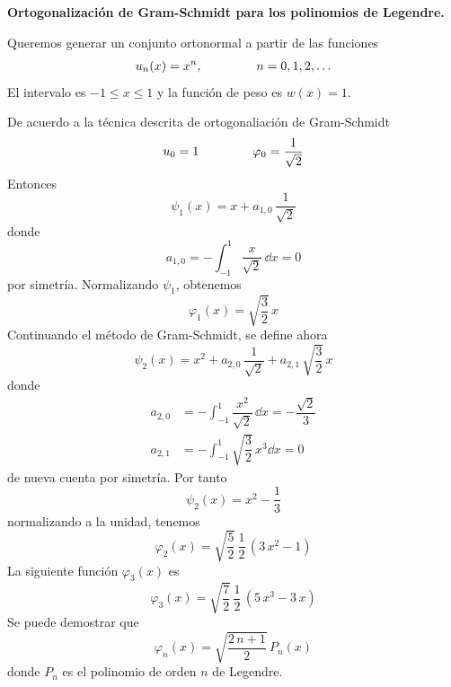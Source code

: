\begin{ejemplo} \textbf{Ortogonalización de Gram-Schmidt para los polinomios de Legendre.}

Queremos generar un conjunto ortonormal a partir de las funciones 
\begin{align*}
u_{n}(x) = x^{n}, \hspace{1.5cm} n = 0, 1, 2, \ldots
\end{align*}
El intervalo es $-1 \leq x \leq 1$ y la función de peso es $w(x)=1$.
\par
De acuerdo a la técnica descrita de ortogonaliación de Gram-Schmidt
\begin{equation}
u_{0} = 1 \hspace{1.5cm} \varphi_{0} =  \dfrac{1}{\sqrt{2}}
\label{eq:ecuacion_10_50}
\end{equation}
Entonces
\begin{equation}
\psi_{1}(x) = x + a_{1,0} \, \dfrac{1}{\sqrt{2}}
\label{eq:ecuacion_10_51}
\end{equation}
donde
\begin{equation}
a_{1, 0} = - \int_{-1}^{1} \dfrac{x}{\sqrt{2}} \, \dd{x} = 0
\label{eq:ecuacion_10_52}
\end{equation}
por simetría. Normalizando $\psi_{1}$, obtenemos
\begin{equation}
\varphi_{1}(x) = \sqrt{\dfrac{3}{2}} \, x
\label{eq:ecuacion_10_53}
\end{equation}
Continuando el método de Gram-Schmidt, se define ahora
\begin{equation}
\psi_{2} (x) = x^{2} +  a_{2, 0} \, \dfrac{1}{\sqrt{2}} +  a_{2, 1} \, \sqrt{\dfrac{3}{2}} \, x
\label{eq:ecuacion_10_54}
\end{equation}
donde
\begin{align}
a_{2, 0} &= - \int_{-1}^{1} \dfrac{x^{2}}{\sqrt{2}} \, \dd{x} = - \dfrac{\sqrt{2}}{3} \label{eq:ecuacion_10_55} \\[1em] 
a_{2, 1} &= - \int_{-1}^{1} \sqrt{\dfrac{3}{2}} \, x^{3} \dd{x} = 0 \label{eq:ecuacion_10_56}
\end{align}
de nueva cuenta por simetría. Por tanto
\begin{equation}
\psi_{2}(x) = x^{2} - \dfrac{1}{3}
\label{eq:ecuacion_10_57}
\end{equation}
normalizando a la unidad, tenemos
\begin{equation}
\varphi_{2} (x) = \sqrt{\dfrac{5}{2}} \, \dfrac{1}{2} \, (3 \, x^{2} - 1)
\label{eq:ecuacion_10_58}
\end{equation}
La siguiente función $\varphi_{3}(x)$ es
\begin{equation}
\varphi_{3} (x) = \sqrt{\dfrac{7}{2}} \, \dfrac{1}{2} \, (5 \, x^{3} - 3 \, x)
\label{eq:ecuacion_10_59}
\end{equation}
Se puede demostrar que
\begin{equation}
\varphi_{n}(x) = \sqrt{\dfrac{2 \, n + 1}{2}} \, P_{n}(x)
\label{eq:ecuacion_10_60}
\end{equation}
donde $P_{n}$ es el polinomio de orden $n$ de Legendre.
\end{ejemplo}
